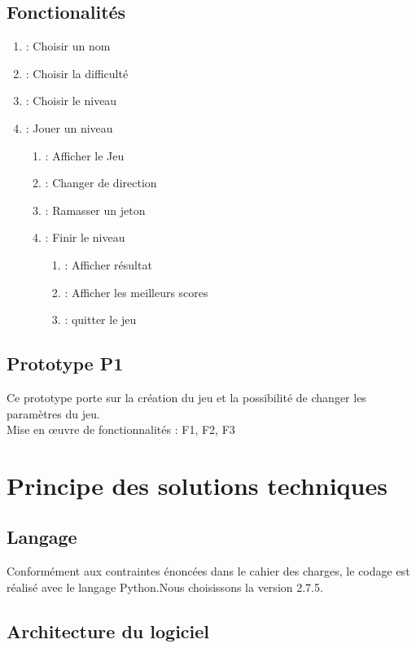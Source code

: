 \documentclass[a4paper,11pt]{scrartcl}
\begin{document}
\subsection{Fonctionalités}

\begin{enumerate}[label*= F\arabic*,font = \textbf]
	\item : Choisir un nom
	\item : Choisir la difficulté
    \item : Choisir le niveau
	\item : Jouer un niveau
	\begin{enumerate}[label*=.\arabic*,font = \textbf]
		\item : Afficher le Jeu
		\item : Changer de direction
		\item : Ramasser un jeton
		\item : Finir le niveau
		\begin{enumerate}[label*=.\arabic*,font = \textbf]
			\item : Afficher résultat
			\item : Afficher les meilleurs scores
			\item : quitter le jeu
		\end{enumerate}
	\end{enumerate}
\end{enumerate}

\subsection{Prototype P1}

Ce prototype porte sur la création du jeu et la possibilité de changer les paramètres du jeu.\\
Mise en œuvre de fonctionnalités : F1, F2, F3

\section{Principe des solutions techniques}

\subsection{Langage}

Conformément aux contraintes énoncées dans le cahier des charges, le codage est réalisé avec le langage Python.Nous choisissons la version 2.7.5.

\subsection{Architecture du logiciel}
\end{document}
